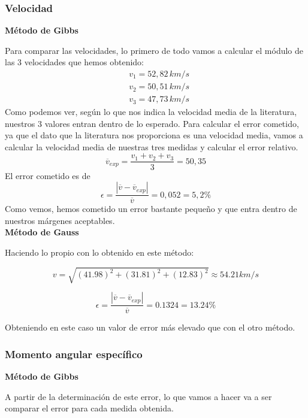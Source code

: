 \documentclass{article}
\numberwithin{equation}{section}
\begin{document}
\subsubsection{Velocidad}
\noindent\textbf{Método de Gibbs}\par
Para comparar las velocidades, lo primero de todo vamos a 
calcular el módulo de las 3 velocidades que hemos obtenido: 
\begin{align*}
    &v_{1}=52,82\, km/s \\
    &v_{2}=50,51\, km/s  \\
    &v_{3}=47,73\, km/s 
\end{align*}
Como podemos ver, según lo que nos indica la velocidad media 
de la literatura, nuestros 3 valores entran dentro de lo esperado. 
Para calcular el error cometido, ya que el dato que la literatura 
nos proporciona es una velocidad media, vamos a calcular la 
velocidad media de nuestras tres medidas y calcular el error 
relativo. 
\begin{equation*}
    \overline{v}_{exp}=\frac{v_{1}+v_{2}+v_{3}}{3}=50,35  
\end{equation*}
El error cometido es de 
\begin{equation*}
    \epsilon=\frac{\left\lvert \overline{v}-\overline{v}_{exp} \right\rvert }{\overline{v}}=0,052=5,2\%
\end{equation*}
Como vemos, hemos cometido un error bastante pequeño y que entra 
dentro de nuestros márgenes aceptables.\\

\noindent\textbf{Método de Gauss}\par
Haciendo lo propio con lo obtenido en este método:

\begin{equation*}
    v=\sqrt{(41.98)^2+(31.81)^2+(12.83)^2}\approx54.21 km/s
\end{equation*}

\begin{equation*}
    \epsilon=\frac{\left\lvert \overline{v}-\overline{v}_{exp} \right\rvert }{\overline{v}}=0.1324=13.24\%
\end{equation*}

Obteniendo en este caso un valor de error más elevado que con el otro método.

\subsubsection{Momento angular específico}
\noindent\textbf{Método de Gibbs}\par
A partir de la determinación de este error, lo que vamos a 
hacer va a ser comparar el error para cada medida obtenida. \\
\end{document}
